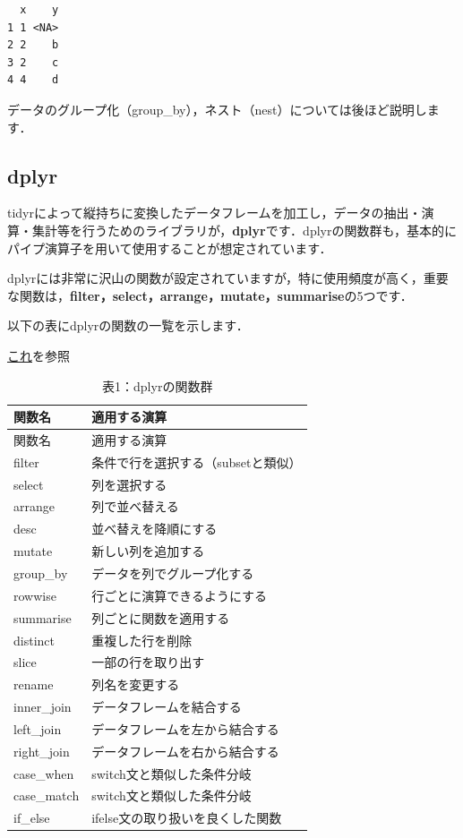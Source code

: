 \documentclass[
  letterpaper,
  DIV=11,
  numbers=noendperiod]{scrreprt}
\begin{document}
\begin{verbatim}
  x    y
1 1 <NA>
2 2    b
3 2    c
4 4    d
\end{verbatim}

データのグループ化（group\_by），ネスト（nest）については後ほど説明します．

\hypertarget{dplyr}{%
\subsection{dplyr}\label{dplyr}}

tidyrによって縦持ちに変換したデータフレームを加工し，データの抽出・演算・集計等を行うためのライブラリが，\textbf{dplyr}です．dplyrの関数群も，基本的にパイプ演算子を用いて使用することが想定されています．

dplyrには非常に沢山の関数が設定されていますが，特に使用頻度が高く，重要な関数は，\textbf{filter，select，arrange，mutate，summarise}の5つです．

以下の表にdplyrの関数の一覧を示します．

\href{https://rstudio.github.io/cheatsheets/data-transformation.pdf}{これ}を参照

\begin{longtable}[]{@{}ll@{}}
\caption{表1：dplyrの関数群}\tabularnewline
\toprule()
関数名 & 適用する演算 \\
\midrule()
\endfirsthead
\toprule()
関数名 & 適用する演算 \\
\midrule()
\endhead
filter & 条件で行を選択する（subsetと類似） \\
select & 列を選択する \\
arrange & 列で並べ替える \\
desc & 並べ替えを降順にする \\
mutate & 新しい列を追加する \\
group\_by & データを列でグループ化する \\
rowwise & 行ごとに演算できるようにする \\
summarise & 列ごとに関数を適用する \\
distinct & 重複した行を削除 \\
slice & 一部の行を取り出す \\
rename & 列名を変更する \\
inner\_join & データフレームを結合する \\
left\_join & データフレームを左から結合する \\
right\_join & データフレームを右から結合する \\
case\_when & switch文と類似した条件分岐 \\
case\_match & switch文と類似した条件分岐 \\
if\_else & ifelse文の取り扱いを良くした関数 \\
\bottomrule()
\end{longtable}
\end{document}
